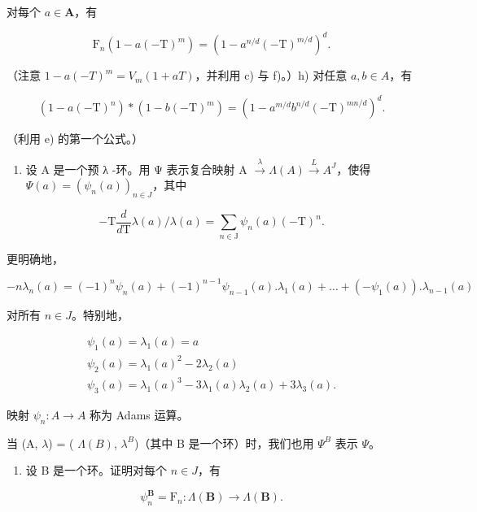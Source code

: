 对每个 \(a \in \mathbf{A}\)，有

\[
\mathrm{F} _ {n} (1 - a (- \mathrm{T}) ^ {m}) = (1 - a ^ {n / d} (- \mathrm{T}) ^ {m / d}) ^ {d}.
\]

（注意 \(1 - a(-T)^{m} = V_{m}(1 + aT)\)，并利用 c) 与 f)。）h) 对任意 \(a, b \in A\)，有

\[
(1 - a (- \mathrm{T}) ^ {n}) * (1 - b (- \mathrm{T}) ^ {m}) = (1 - a ^ {m / d} b ^ {n / d} (- \mathrm{T}) ^ {m n / d}) ^ {d}.
\]

（利用 e) 的第一个公式。）

\begin{enumerate}
\def\labelenumi{\arabic{enumi})}
\setcounter{enumi}{47}
\tightlist
\item
  设 A 是一个预 λ -环。用 Ψ 表示复合映射 A \(\xrightarrow{\lambda} \Lambda(A) \xrightarrow{L} A^{J}\)，使得 \(\Psi(a) = (\psi_{n}(a))_{n \in J}\)，其中
\end{enumerate}

\[
- \mathrm{T} \frac {d}{d \mathrm{T}} \lambda (a) / \lambda (a) = \sum_ {n \in \mathrm{J}} \psi_ {n} (a) (- \mathrm{T}) ^ {n}.
\]

更明确地，

\[
- n \lambda_ {n} (a) = (- 1) ^ {n} \psi_ {n} (a) + (- 1) ^ {n - 1} \psi_ {n - 1} (a). \lambda_ {1} (a) + \dots + (- \psi_ {1} (a)). \lambda_ {n - 1} (a)
\]

对所有 \(n \in J\)。特别地，

\[
\begin{array}{l} \psi_ {1} (a) = \lambda_ {1} (a) = a \\ \psi_ {2} (a) = \lambda_ {1} (a) ^ {2} - 2 \lambda_ {2} (a) \\ \psi_ {3} (a) = \lambda_ {1} (a) ^ {3} - 3 \lambda_ {1} (a) \lambda_ {2} (a) + 3 \lambda_ {3} (a). \end{array}
\]

映射 \(\psi_{n}:A\to A\) 称为 Adams 运算。

当 (A, \(\lambda\)) = ( \(\Lambda(B)\), \(\lambda^{B}\))（其中 B 是一个环）时，我们也用 \(\Psi^{B}\) 表示 \(\Psi\)。

\begin{enumerate}
\def\labelenumi{\alph{enumi})}
\tightlist
\item
  设 B 是一个环。证明对每个 \(n \in J\)，有
\end{enumerate}

\[
\psi_ {n} ^ {\mathbf {B}} = \mathrm{F} _ {n}: \Lambda (\mathbf {B}) \rightarrow \Lambda (\mathbf {B}).
\]


